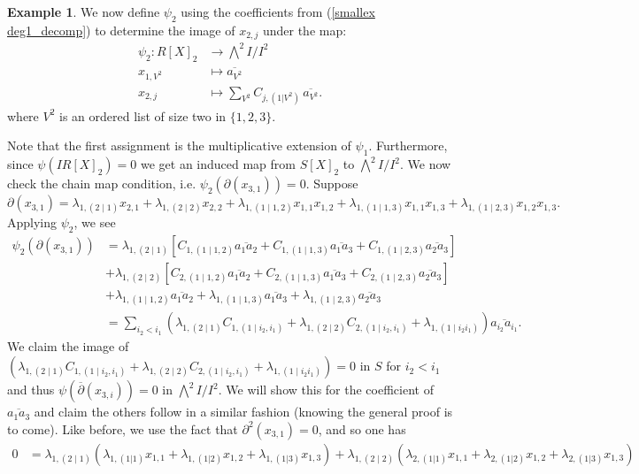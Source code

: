 \documentclass{amsart}
\theoremstyle{definition}
\newtheorem{ex}[theorem]{Example}
\theoremstyle{remark}
\begin{document}
\begin{ex}
We now define $\psi_2$ using the coefficients from (\ref{smallex deg1_decomp}) to determine the image of $x_{2,j}$ under the map:
\begin{align*}
    \psi_2: R[ X]_{2}  &\to \bigwedge^{2} I/I^2\\
    x_{1,V^2} &\mapsto \overline{a_{V^2}}  \\
    x_{2,j} &\mapsto \sum_{V^2}C_{j,(1|V^2)} \,  \overline{a_{V^2}}.
\end{align*}
where $V^2$ is an ordered list of size two in $\{1,2,3\}$.

Note that the first assignment is the multiplicative extension of $\psi_1$. Furthermore, since $\psi(IR[ X]_{2})=0$ we get an induced map from $S[ X]_2$ to $\bigwedge^2 I/I^2$. We now check the chain map condition, i.e. $\psi_2(\partial(x_{3,1})) = 0$. Suppose
\[
\partial(x_{3,1}) = \lambda_{1, (2\mid1)}x_{2,1} + \lambda_{1,(2\mid 2)}x_{2,2} + \lambda_{1,(1\mid 1,2)}x_{1,1}x_{1,2} + \lambda_{1, (1 \mid 1,3)}x_{1,1}x_{1,3}+  \lambda_{1, (1 \mid 2,3)}x_{1,2}x_{1,3}.
\]
Applying $\psi_2$, we see 
\begin{align*}
    \psi_2(\partial(x_{3,1})) &= \lambda_{1,(2\mid 1)}\left[ C_{1,(1 \mid 1,2)}\overline{a_1a_2} + C_{1,(1 \mid 1,3)}\overline{a_1a_3}+ C_{1,(1 \mid 2,3)}\overline{a_2a_3}\right] \\
    &+ \lambda_{1,(2\mid 2)}\left[ C_{2,(1 \mid 1,2)}\overline{a_1a_2} + C_{2,(1 \mid 1,3)}\overline{a_1a_3}+ C_{2,(1 \mid 2,3)}\overline{a_2a_3}\right] \\
    &+ \lambda_{1, (1 \mid 1,2)}\overline{a_1a_2} +\lambda_{1, (1 \mid 1,3)}\overline{a_1a_3}+  \lambda_{1, (1 \mid 2,3)}\overline{a_2a_3}\\
    &= \sum_{i_2<i_1}\left( \lambda_{1,(2 \mid 1)}C_{1,(1 \mid i_2,i_1)}+ \lambda_{1,(2 \mid 2)}C_{2,(1 \mid i_2,i_1)} +\lambda_{1,(1\mid i_2i_1)}\right)\overline{a_{i_2}a_{i_1}}.
\end{align*}
We claim the image of $\left( \lambda_{1,(2 \mid 1)}C_{1,(1 \mid i_2,i_1)}+ \lambda_{1,(2 \mid 2)}C_{2,(1 \mid i_2,i_1)} +\lambda_{1,(1\mid i_2i_1)}\right)  = 0$ in $S$ for  $i_2 <i_1$ and thus $\psi(\overline{\partial}(x_{3,i}))=0$ in $\bigwedge^{2}I/I^2$. We will show this for the coefficient of $\overline{a_1a_3}$ and claim the others follow in a similar fashion (knowing the general proof is to come). Like before, we use the fact that $\partial^2(x_{3,1})=0$, and so one has
\begin{align*}
    0 &= \lambda_{1,(2 \mid 1)}\left(\lambda_{1, (1|1)} x_{1,1} + \lambda_{1, (1|2)} x_{1,2} + \lambda_{1, (1|3)} x_{1,3} \right) + \lambda_{1,(2 \mid 2)}\left( \lambda_{2, (1|1)} x_{1,1} + \lambda_{2, (1|2)} x_{1,2} + \lambda_{2, (1|3)} x_{1,3} \right) \\

\end{align*}
\end{ex}
\end{document}
